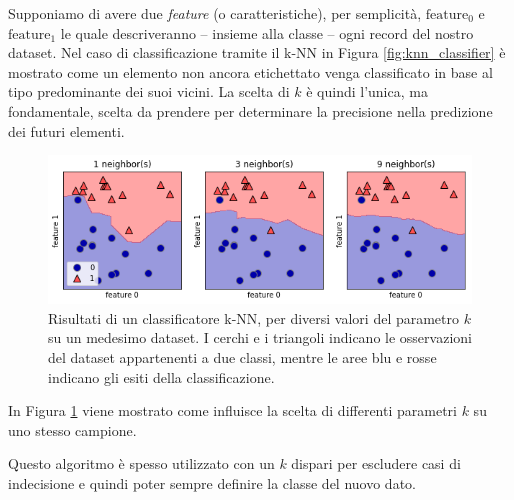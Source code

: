 \documentclass[12pt,italian]{report}
\begin{document}
Supponiamo di avere due \emph{feature} (o caratteristiche), per semplicità, $ \mathrm{feature_0} $  e $ \mathrm{feature_1} $ le quale descriveranno -- insieme alla classe -- ogni record del nostro dataset.  Nel caso di classificazione tramite il k-NN in Figura \ref{fig:knn_classifier} è mostrato come un elemento non ancora etichettato venga classificato in base al tipo predominante dei suoi vicini. La scelta di $ k $ è quindi l'unica, ma fondamentale, scelta da prendere per determinare la precisione nella predizione dei futuri elementi.

\begin{figure}[h!]
	\center
	\includegraphics[scale=0.55]{../img/knn_comparison}
	\caption{Risultati di un classificatore k-NN, per diversi valori del parametro $k$ su un medesimo dataset. I cerchi e i triangoli indicano le osservazioni del dataset appartenenti a due classi, mentre le aree blu e rosse indicano gli esiti della classificazione.}
	\label{fig:knn_difference}
\end{figure}


In Figura \ref{fig:knn_difference} viene mostrato come influisce la scelta di differenti parametri $ k $ su uno stesso campione.

Questo algoritmo è spesso utilizzato con un $ k $ dispari per escludere casi di indecisione e quindi poter sempre definire la classe del nuovo dato.
\end{document}
